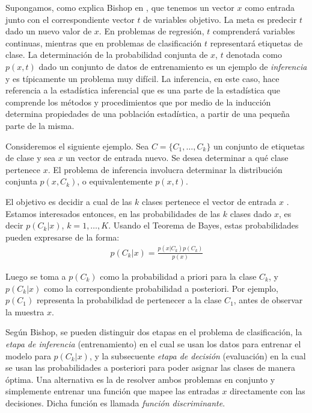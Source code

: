 	Supongamos, como explica Bishop en \cite{Bis07}, que tenemos un vector $x$ como entrada junto con el correspondiente vector $t$ de variables objetivo. La meta es predecir $t$ dado un nuevo valor de $x$. En problemas de regresión, $t$ comprenderá variables continuas, mientras que en problemas de clasificación $t$ representará etiquetas de clase. La determinación de la probabilidad conjunta de $x$, $t$ denotada como $p(x,t)$ dado un conjunto de datos de entrenamiento es un ejemplo de \textit{inferencia} y es típicamente un problema muy difícil. La inferencia, en este caso, hace referencia a la estadística inferencial que es una parte de la estadística que comprende los métodos y procedimientos que por medio de la inducción determina propiedades de una población estadística, a partir de una pequeña parte de la misma.
	
	Consideremos el siguiente ejemplo. Sea $C=\{C_1,\dots,C_k\}$ un conjunto de etiquetas de clase y sea $x$ un vector de entrada nuevo. Se desea determinar a qué clase pertenece $x$. El problema de inferencia involucra determinar la distribución conjunta $p(x,C_k)$, o equivalentemente $p(x,t)$.

	El objetivo es decidir a cual de las $k$ clases pertenece el vector de entrada $x$ . Estamos interesados entonces, en las probabilidades de las $k$ clases dado $x$, es decir $p(C_k|x)$, $k=1,\dots,K$. Usando el Teorema de Bayes, estas probabilidades pueden expresarse de la forma:
		\begin{align*}
			p(C_k|x) = \frac{p(x|C_k)p(C_k)}{p(x)}
		\end{align*}

	Luego se toma a $p(C_k)$ como la probabilidad a priori para la clase $C_k$, y $p(C_k|x)$ como la correspondiente probabilidad a posteriori. Por e\-jem\-plo, $p(C_1)$ representa la probabilidad de pertenecer a la clase $C_1$, antes de observar la muestra $x$.
	
	Según Bishop, se pueden distinguir dos etapas en el problema de clasificación, la \textit{etapa de inferencia} (entrenamiento) en el cual se usan los datos para entrenar el modelo para $p(C_k|x)$, y la subsecuente \textit{etapa de decisión} (evaluación) en la cual se usan las probabilidades a posteriori para poder asignar las clases de manera óptima. Una alternativa es la de resolver ambos problemas en conjunto y simplemente entrenar una función que mapee las entradas $x$ directamente con las decisiones. Dicha función es llamada \textit{función discriminante}.
	
